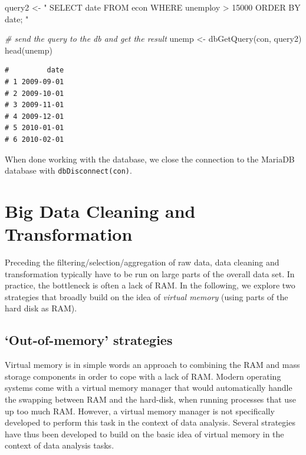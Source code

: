 \documentclass[
  12pt,
]{style/krantz}
\newenvironment{Shaded}{\begin{snugshade}}{\end{snugshade}}
\newcommand{\CommentTok}[1]{\textcolor[rgb]{0.56,0.35,0.01}{\textit{#1}}}
\newcommand{\FunctionTok}[1]{\textcolor[rgb]{0.00,0.00,0.00}{#1}}
\newcommand{\NormalTok}[1]{#1}
\newcommand{\OtherTok}[1]{\textcolor[rgb]{0.56,0.35,0.01}{#1}}
\newcommand{\StringTok}[1]{\textcolor[rgb]{0.31,0.60,0.02}{#1}}
\begin{document}
\begin{Shaded}
\begin{Highlighting}[]
\NormalTok{query2 }\OtherTok{\textless{}{-}}
\StringTok{"}
\StringTok{SELECT date FROM econ }
\StringTok{WHERE unemploy \textgreater{} 15000}
\StringTok{ORDER BY date;}
\StringTok{"}

\CommentTok{\# send the query to the db and get the result}
\NormalTok{unemp }\OtherTok{\textless{}{-}} \FunctionTok{dbGetQuery}\NormalTok{(con, query2)}
\FunctionTok{head}\NormalTok{(unemp)}
\end{Highlighting}
\end{Shaded}

\begin{verbatim}
#         date
# 1 2009-09-01
# 2 2009-10-01
# 3 2009-11-01
# 4 2009-12-01
# 5 2010-01-01
# 6 2010-02-01
\end{verbatim}

When done working with the database, we close the connection to the MariaDB database with \texttt{dbDisconnect(con)}.

\hypertarget{big-data-cleaning-and-transformation}{%
\chapter{Big Data Cleaning and Transformation}\label{big-data-cleaning-and-transformation}}

Preceding the filtering/selection/aggregation of raw data, data cleaning and transformation typically have to be run on large parts of the overall data set. In practice, the bottleneck is often a lack of RAM. In the following, we explore two strategies that broadly build on the idea of \emph{virtual memory} (using parts of the hard disk as RAM).

\hypertarget{out-of-memory-strategies}{%
\section{`Out-of-memory' strategies}\label{out-of-memory-strategies}}

Virtual memory is in simple words an approach to combining the RAM and mass storage components in order to cope with a lack of RAM. Modern operating systems come with a virtual memory manager that would automatically handle the swapping between RAM and the hard-disk, when running processes that use up too much RAM. However, a virtual memory manager is not specifically developed to perform this task in the context of data analysis. Several strategies have thus been developed to build on the basic idea of virtual memory in the context of data analysis tasks.
\end{document}
